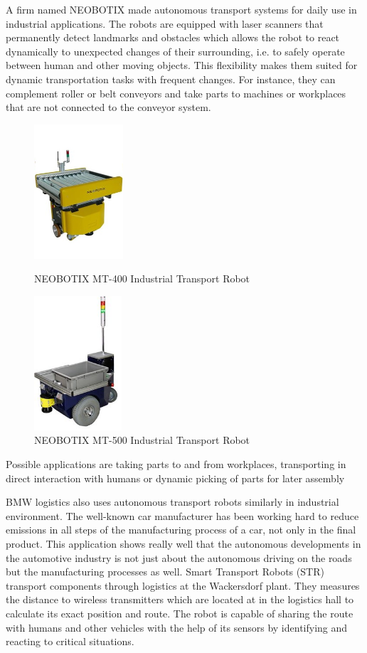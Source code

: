 \documentclass[12pt,english,twoside]{article}
\begin{document}
A firm named NEOBOTIX made autonomous transport systems for daily use in industrial applications. The robots are equipped with laser scanners that permanently detect landmarks and obstacles which allows the robot to react dynamically to unexpected changes of their surrounding, i.e. to safely operate between human and other moving objects. This flexibility makes them suited for dynamic transportation tasks with frequent changes. For instance, they can complement roller or belt conveyors and take parts to machines or workplaces that are not connected to the conveyor system. \cite{neo}

\begin{figure}[htb!]
	\centering
	\centering
	\includegraphics[height=5cm]{figures/neo1.jpg}
	\caption{{\small NEOBOTIX MT-400 Industrial Transport Robot \cite{neo}}}
	\endminipage\hfill
	\centering
	\includegraphics[height=5cm]{figures/neo2.jpg}
	\caption{{\small NEOBOTIX MT-500 Industrial Transport Robot \cite{neo}}}
	\label{conv2}
	\endminipage\hfill
\end{figure} 

\noindent Possible applications are taking parts to and from workplaces, transporting in direct interaction with humans or dynamic picking of parts for later assembly

BMW logistics also uses autonomous transport robots similarly in industrial environment. The well-known car manufacturer has been working hard to reduce emissions in all steps of the manufacturing process of a car, not only in the final product. This application shows really well that the autonomous developments in the automotive industry is not just about the autonomous driving on the roads but the manufacturing processes as well. Smart Transport Robots (STR) transport components through logistics at the Wackersdorf plant. They measures the distance to wireless transmitters which are located at in the logistics hall to calculate its exact position and route. The robot is capable of sharing the route with humans and other vehicles with the help of its sensors by identifying and reacting to critical situations. \cite{bmw}
\end{document}
